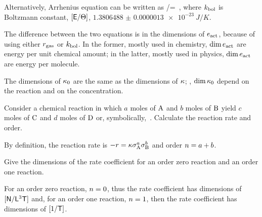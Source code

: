 Alternatively, Arrhenius equation can be written as
\beq
\krcoeff\vat\temp/\freqfact = \exp{}\,,
\eeq
where $k_\text{bol}$ is Boltzmann constant, $[\mathsf{E}/\Theta]$, $\SI{1.3806488(13)e-23}{J/K}$.

The difference between the two equations is in the dimensions of $e_\text{act}$, because of using either $r_\text{gas}$ or $k_\text{bol}$. In the former, mostly used in chemistry, $\dim e_\text{act}$ are energy per unit chemical amount; in the latter, mostly used in physics, $\dim e_\text{act}$ are energy per molecule.

The dimensions of $\kappa_0$ are the same as the dimensions of $\kappa$; \ie, $\dim\kappa_0$ depend on the reaction and on the concentration.

\begin{example}
Consider a chemical reaction in which $a$ moles of $\ce A$ and $b$ moles of $\ce B$ yield $c$ moles of $\ce C$ and $d$ moles of $\ce D$ or, symbolically,
\beq
{}\,.
\eeq
Calculate the reaction rate and order.
\end{example}

\begin{solution}
By definition, the reaction rate is $-\rrate = \krcoeff\conc A^a\conc B^b$ and order $n = a + b$.
\end{solution}

\begin{example}
Give the dimensions of the rate coefficient for an order zero reaction and an order one reaction.
\end{example}

\begin{solution}
For an order zero reaction, $n = 0$, thus the rate coefficient has dimensions of $[\mathsf{N}/\mathsf{L}^3\mathsf{T}]$ and, for an order one reaction, $n = 1$, then the rate coefficient has dimensions of $[1/\mathsf{T}]$.
\end{solution}
